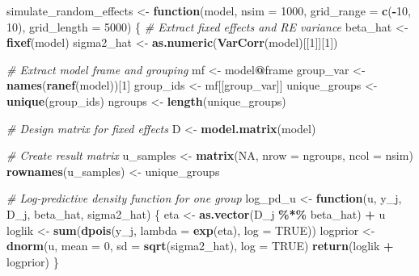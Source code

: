 \documentclass[
  letterpaper,
]{krantz}
\newenvironment{Shaded}{\begin{snugshade}}{\end{snugshade}}
\newcommand{\AttributeTok}[1]{\textcolor[rgb]{0.13,0.29,0.53}{#1}}
\newcommand{\CommentTok}[1]{\textcolor[rgb]{0.56,0.35,0.01}{\textit{#1}}}
\newcommand{\ConstantTok}[1]{\textcolor[rgb]{0.56,0.35,0.01}{#1}}
\newcommand{\ControlFlowTok}[1]{\textcolor[rgb]{0.13,0.29,0.53}{\textbf{#1}}}
\newcommand{\DecValTok}[1]{\textcolor[rgb]{0.00,0.00,0.81}{#1}}
\newcommand{\FunctionTok}[1]{\textcolor[rgb]{0.13,0.29,0.53}{\textbf{#1}}}
\newcommand{\NormalTok}[1]{#1}
\newcommand{\OtherTok}[1]{\textcolor[rgb]{0.56,0.35,0.01}{#1}}
\newcommand{\SpecialCharTok}[1]{\textcolor[rgb]{0.81,0.36,0.00}{\textbf{#1}}}
\begin{document}
\begin{Shaded}
\begin{Highlighting}[]
\NormalTok{simulate\_random\_effects }\OtherTok{\textless{}{-}} \ControlFlowTok{function}\NormalTok{(model, }\AttributeTok{nsim =} \DecValTok{1000}\NormalTok{, }\AttributeTok{grid\_range =} \FunctionTok{c}\NormalTok{(}\SpecialCharTok{{-}}\DecValTok{10}\NormalTok{, }\DecValTok{10}\NormalTok{), }\AttributeTok{grid\_length =} \DecValTok{5000}\NormalTok{) \{}
  \CommentTok{\# Extract fixed effects and RE variance}
\NormalTok{  beta\_hat }\OtherTok{\textless{}{-}} \FunctionTok{fixef}\NormalTok{(model)}
\NormalTok{  sigma2\_hat }\OtherTok{\textless{}{-}} \FunctionTok{as.numeric}\NormalTok{(}\FunctionTok{VarCorr}\NormalTok{(model)[[}\DecValTok{1}\NormalTok{]][}\DecValTok{1}\NormalTok{])}
  
  \CommentTok{\# Extract model frame and grouping}
\NormalTok{  mf }\OtherTok{\textless{}{-}}\NormalTok{ model}\SpecialCharTok{@}\NormalTok{frame}
\NormalTok{  group\_var }\OtherTok{\textless{}{-}} \FunctionTok{names}\NormalTok{(}\FunctionTok{ranef}\NormalTok{(model))[}\DecValTok{1}\NormalTok{]}
\NormalTok{  group\_ids }\OtherTok{\textless{}{-}}\NormalTok{ mf[[group\_var]]}
\NormalTok{  unique\_groups }\OtherTok{\textless{}{-}} \FunctionTok{unique}\NormalTok{(group\_ids)}
\NormalTok{  ngroups }\OtherTok{\textless{}{-}} \FunctionTok{length}\NormalTok{(unique\_groups)}
  
  \CommentTok{\# Design matrix for fixed effects}
\NormalTok{  D }\OtherTok{\textless{}{-}} \FunctionTok{model.matrix}\NormalTok{(model)}
  
  \CommentTok{\# Create result matrix}
\NormalTok{  u\_samples }\OtherTok{\textless{}{-}} \FunctionTok{matrix}\NormalTok{(}\ConstantTok{NA}\NormalTok{, }\AttributeTok{nrow =}\NormalTok{ ngroups, }\AttributeTok{ncol =}\NormalTok{ nsim)}
  \FunctionTok{rownames}\NormalTok{(u\_samples) }\OtherTok{\textless{}{-}}\NormalTok{ unique\_groups}
  
  \CommentTok{\# Log{-}predictive density function for one group}
\NormalTok{  log\_pd\_u }\OtherTok{\textless{}{-}} \ControlFlowTok{function}\NormalTok{(u, y\_j, D\_j, beta\_hat, sigma2\_hat) \{}
\NormalTok{    eta }\OtherTok{\textless{}{-}} \FunctionTok{as.vector}\NormalTok{(D\_j }\SpecialCharTok{\%*\%}\NormalTok{ beta\_hat) }\SpecialCharTok{+}\NormalTok{ u}
\NormalTok{    loglik }\OtherTok{\textless{}{-}} \FunctionTok{sum}\NormalTok{(}\FunctionTok{dpois}\NormalTok{(y\_j, }\AttributeTok{lambda =} \FunctionTok{exp}\NormalTok{(eta), }\AttributeTok{log =} \ConstantTok{TRUE}\NormalTok{))}
\NormalTok{    logprior }\OtherTok{\textless{}{-}} \FunctionTok{dnorm}\NormalTok{(u, }\AttributeTok{mean =} \DecValTok{0}\NormalTok{, }\AttributeTok{sd =} \FunctionTok{sqrt}\NormalTok{(sigma2\_hat), }\AttributeTok{log =} \ConstantTok{TRUE}\NormalTok{)}
    \FunctionTok{return}\NormalTok{(loglik }\SpecialCharTok{+}\NormalTok{ logprior)}
\NormalTok{  \}}
  

\end{Highlighting}
\end{Shaded}
\end{document}
